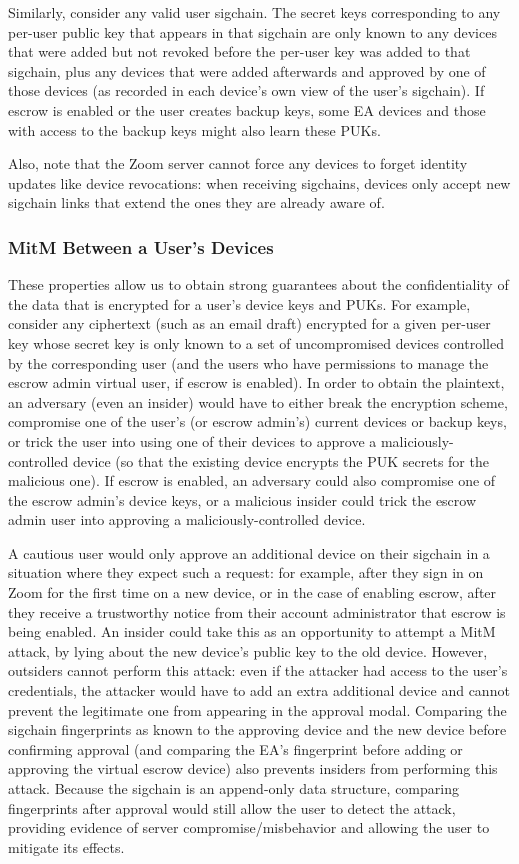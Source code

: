 Similarly, consider any valid user sigchain. The secret keys corresponding to any per-user public
key that appears in that sigchain are only known to any devices that were added but not revoked
before the per-user key was added to that sigchain, plus any devices that were added afterwards and
approved by one of those devices (as recorded in each device's own view of the user's sigchain). If
escrow is enabled or the user creates backup keys, some EA devices and those with access to the
backup keys might also learn these PUKs.

Also, note that the Zoom server cannot force any devices to forget identity updates like device
revocations: when receiving sigchains, devices only accept new sigchain links that extend the ones
they are already aware of.

\subsubsection{MitM Between a User's Devices}
These properties allow us to obtain strong guarantees about the confidentiality of the data that is
encrypted for a user's device keys and PUKs. For example, consider any ciphertext (such as an email
draft) encrypted for a given per-user key whose secret key is only known to a set of uncompromised
devices controlled by the corresponding user (and the users who have permissions to manage the
escrow admin virtual user, if escrow is enabled). In order to obtain the plaintext, an adversary
(even an insider) would have to either break the encryption scheme, compromise one of the user's (or
escrow admin's) current devices or backup keys, or trick the user into using one of their devices to
approve a maliciously-controlled device (so that the existing device encrypts the PUK secrets for
the malicious one). If escrow is enabled, an adversary could also compromise one of the escrow
admin's device keys, or a malicious insider could trick the escrow admin user into approving a
maliciously-controlled device.

A cautious user would only approve an additional device on their sigchain in a situation where they
expect such a request: for example, after they sign in on Zoom for the first time on a new device,
or in the case of enabling escrow, after they receive a trustworthy notice from their account
administrator that escrow is being enabled. An insider could take this as an opportunity to attempt
a MitM attack, by lying about the new device's public key to the old device. However, outsiders
cannot perform this attack: even if the attacker had access to the user's credentials, the attacker
would have to add an extra additional device and cannot prevent the legitimate one from appearing in
the approval modal. Comparing the sigchain fingerprints as known to the approving device and the new
device before confirming approval (and comparing the EA's fingerprint before adding or approving the
virtual escrow device) also prevents insiders from performing this attack. Because the sigchain is
an append-only data structure, comparing fingerprints after approval would still allow the user to
detect the attack, providing evidence of server compromise/misbehavior and allowing the user to
mitigate its effects.

